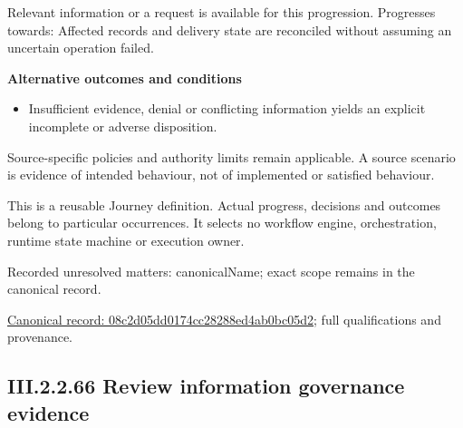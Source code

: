 Relevant information or a request is available for this progression. Progresses towards: Affected records and delivery state are reconciled without assuming an uncertain operation failed.



\par\medskip\textbf{Alternative outcomes and conditions}\par


\begin{itemize}


\item Insufficient evidence, denial or conflicting information yields an explicit incomplete or adverse disposition.

\end{itemize}


Source-specific policies and authority limits remain applicable. A source scenario is evidence of intended behaviour, not of implemented or satisfied behaviour.



This is a reusable Journey definition. Actual progress, decisions and outcomes belong to particular occurrences. It selects no workflow engine, orchestration, runtime state machine or execution owner.


{\small Recorded unresolved matters: canonicalName; exact scope remains in the canonical record.}\par
{\footnotesize \href{../../../../../../../continuum/strategy/value-stream/08c2d05dd0174cc28288ed4ab0bc05d2.md}{Canonical record: 08c2d05dd0174cc28288ed4ab0bc05d2}; full qualifications and provenance.}\par
\subsection*{III.2.2.66 Review information governance evidence}
\label{navigation:III.2.2.66}

